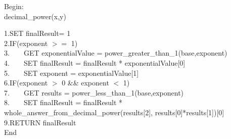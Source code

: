 \documentclass[a4paper,12pt]{article}
\begin{document}
        \vspace{0.5cm}
       
        \begin{procedure}
        Begin:\\
        \caption{ decimal\_power(x,y)}
        1.SET finalResult= 1\\
        2.IF(exponent $>=$ 1)\\
        3.$\hspace{2em}$GET exponentialValue = power\_greater\_than\_1(base,exponent)\\
        4.$\hspace{2em}$SET finalResult = finalResult * exponentialValue[0]\\
        5.$\hspace{2em}$SET exponent = exponentialValue[1]\\
        6.IF(exponent $>$ 0 && exponent $<$ 1)\\
        7.$\hspace{2em}$GET results = power\_less\_than\_1(base,exponent)\\
        8.$\hspace{2em}$SET finalResult = finalResult * whole\_answer\_from\_decimal\_power(results[2], results[0]*results[1])[0]\\
        9.RETURN finalResult\\
        End\\
        \end{procedure}
\end{document}
